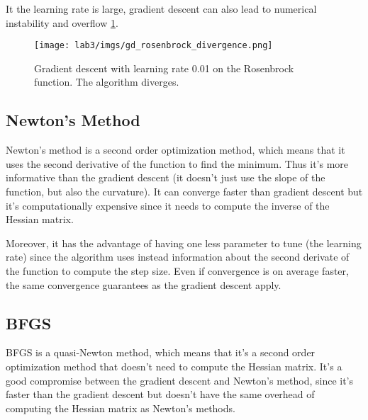 It the learning rate is large, gradient descent can also lead to numerical instability and overflow \ref{fig:ros-div}.
\begin{figure}[H]
    \texttt{[image: lab3/imgs/gd\_rosenbrock\_divergence.png]}
    \caption{Gradient descent with learning rate 0.01 on the Rosenbrock function. The algorithm diverges.}
    \label{fig:ros-div}
\end{figure}



\subsection{Newton's Method}
\label{sec:newtons-method}
Newton's method is a second order optimization method, which means that it uses the second derivative of the function to find the minimum. Thus it's more informative than the gradient descent (it doesn't just use the slope of the function, but also the curvature). It can converge faster than gradient descent but it's computationally expensive since it needs to compute the inverse of the Hessian matrix.

Moreover, it has the advantage of having one less parameter to tune (the learning rate) since the algorithm uses instead information about the second derivate of the function to compute the step size.
Even if convergence is on average faster, the same convergence guarantees as the gradient descent apply.


\subsection{BFGS}
\label{sec:bfgs}
BFGS is a quasi-Newton method, which means that it's a second order optimization method that doesn't need to compute the Hessian matrix. It's a good compromise between the gradient descent and Newton's method, since it's faster than the gradient descent but doesn't have the same overhead of computing the Hessian matrix as Newton's methods.

